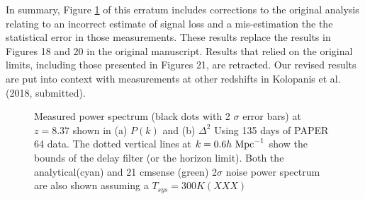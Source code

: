 \documentclass[onecolumn]{emulateapj} \shorttitle{}
\newcommand{\hMpci}{h\ {\rm Mpc}^{-1}}
\newcommand{\kolopaniscitet}{Kolopanis et al. (2018, submitted)}
\begin{document}
In summary, Figure \ref{fig:updated_pspec} of this erratum includes corrections to the original analysis relating to
an incorrect estimate of signal loss and a mis-estimation the the statistical error in those measurements.
These results replace the results in Figures 18 and 20 in the original manuscript.  Results that relied on
the original limits, including those presented in Figures 21, are retracted.
Our revised results are put into context with measurements at other redshifts in \kolopaniscitet.  

\begin{figure}%
    \centering
    \qquad
    \caption{Measured power spectrum (black dots with 2 $\sigma$ error bars) at $z=8.37$ shown in (a) $P(k)$ and (b) $\Delta^{2}$
             Using 135 days of PAPER 64 data. The dotted vertical lines at $k=0.6\hMpci$ show the bounds of the delay filter (or the horizon limit).
             Both the analytical(cyan) and 21 cmsense (green) 2$\sigma$ noise power spectrum are also shown assuming a $T_{sys}=300K (XXX)$}%
    \label{fig:updated_pspec}%
\end{figure}

\clearpage
\nocite{*}


\end{document}
